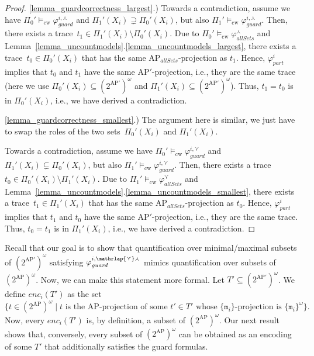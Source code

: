 \documentclass[dvipsnames,10pt,a4paper]{amsart}
\theoremstyle{definition}
\theoremstyle{remark}
\renewcommand{\phi}{\varphi}
\newcommand{\pow}[1]{2^{#1}}
\newcommand{\set}[1]{\{#1\}}
\newcommand{\ap}[0]{\mathrm{AP}}
\newcommand{\smallest}{\curlyvee}
\newcommand{\largest}{\curlywedge}
\newcommand{\smalar}{{\mathrlap{\curlyvee}\curlywedge}}
\newcommand{\allsets}{{\mathit{allSets}}}
\newcommand{\parti}{\mathit{part}}
\newcommand{\cw}{\mathrm{cw}}
\newcommand{\marker}{\texttt{m}}
\newcommand{\guard}{\mathit{guard}}
\newcommand{\enc}{\mathit{enc}}
\begin{document}
\begin{proof}
\ref{lemma_guardcorrectness_largest}.) 
Towards a contradiction, assume we have $\Pi_0' \models_\cw \phi_\guard^{i,\largest}$ and $\Pi_1'(X_i) \supsetneq \Pi_0'(X_i)$, but also $\Pi_1' \models_\cw \phi_\guard^{i,\largest}$.
Then, there exists a trace~$t_1 \in \Pi_1'(X_i) \setminus \Pi_0'(X_i)$. 
Due to $\Pi_0'\models_\cw \phi_\allsets^\largest$ and Lemma~\ref{lemma_uncountmodels}.\ref{lemma_uncountmodels_largest}, there exists a trace~$t_0 \in \Pi_0'(X_i)$ that has the same $\ap_\allsets$-projection as $t_1$. 
Hence, $\varphi_\parti^{i}$ implies that $t_0$ and $t_1$ have the same $\ap'$-projection, i.e., they are the same trace (here we use $\Pi_0'(X_i) \subseteq (\pow{\ap'})^\omega$ and  $\Pi_1'(X_i) \subseteq (\pow{\ap'})^\omega$).
Thus, $t_1 = t_0$ is in $\Pi_0'(X_i)$, i.e., we have derived a contradiction.

\ref{lemma_guardcorrectness_smallest}.)
The argument here is similar, we just have to swap the roles of the two sets~$\Pi_0'(X_i)$ and 
$\Pi_1'(X_i)$.

Towards a contradiction, assume we have $\Pi_0' \models_\cw \phi_\guard^{i,\smallest}$ and $\Pi_1'(X_i) \subsetneq \Pi_0'(X_i)$, but also $\Pi_1' \models_\cw \phi_\guard^{i,\smallest}$.
Then, there exists a trace~$t_0 \in \Pi_0'(X_i) \setminus \Pi_1'(X_i)$. 
Due to $\Pi_1'\models_\cw \phi_\allsets^\smallest$ and Lemma~\ref{lemma_uncountmodels}.\ref{lemma_uncountmodels_smallest}, there exists a trace~$t_1 \in \Pi_1'(X_i)$ that has the same $\ap_\allsets$-projection as $t_0$. 
Hence, $\varphi_\parti^{i}$ implies that $t_1$ and $t_0$ have the same $\ap'$-projection, i.e., they are the same trace.
Thus, $t_0 = t_1$ is in $\Pi_1'(X_i)$, i.e., we have derived a contradiction.
\end{proof}

Recall that our goal is to show that quantification over minimal/maximal subsets of $(\pow{\ap'})^\omega$ satisfying $\phi_\guard^{i,\smalar}$ mimics quantification over subsets of $(\pow{\ap})^\omega$.
Now, we can make this statement more formal.
Let $T' \subseteq (\pow{\ap'})^\omega$. We define $\enc_i(T')$ as the set
\[
\set{
t \in (\pow{\ap})^\omega \mid t \text{ is the $\ap$-projection of some $t' \in T'$ whose $\set{\marker_{i}}$-projection is $\set{\marker_{i}}^\omega$}
}.
\]
Now, every $\enc_i(T')$ is, by definition, a subset of $(\pow{\ap})^\omega$. 
Our next result shows that, conversely, every subset of $(\pow{\ap})^\omega$ 
can be obtained as an encoding of some $T'$ that additionally satisfies the guard formulas.
\end{document}
